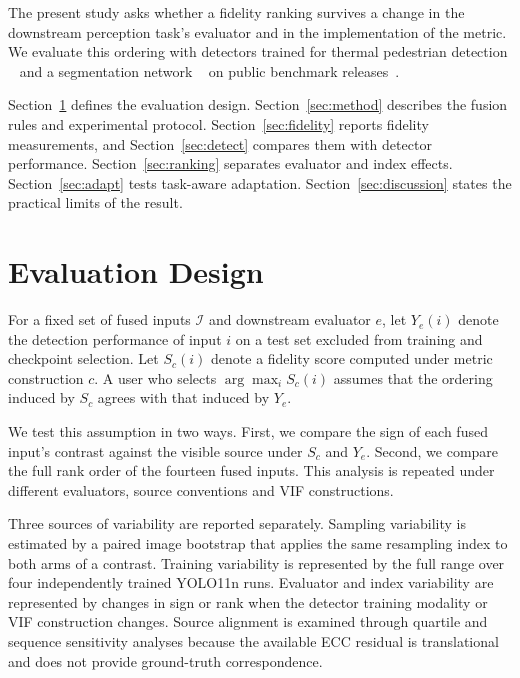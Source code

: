 \documentclass[10pt,a4paper]{article}
\begin{document}
The present study asks whether a fidelity ranking survives a change in the downstream
perception task's evaluator and in the implementation of the metric. We evaluate this
ordering with detectors trained for thermal pedestrian detection
~\cite{redmon2016yolo,jocher2024yolo,lv2024rtdetr} and a segmentation network
~\cite{ronneberger2015} on public benchmark releases~\cite{flir_adas}.

Section~\ref{sec:validity} defines the evaluation design.
Section~\ref{sec:method} describes the fusion rules and experimental protocol.
Section~\ref{sec:fidelity} reports fidelity measurements, and
Section~\ref{sec:detect} compares them with detector performance.
Section~\ref{sec:ranking} separates evaluator and index effects.
Section~\ref{sec:adapt} tests task-aware adaptation.
Section~\ref{sec:discussion} states the practical limits of the result.

\section{Evaluation Design}
\label{sec:validity}

For a fixed set of fused inputs $\mathcal{I}$ and downstream evaluator $e$, let
$Y_e(i)$ denote the detection performance of input $i$ on a test set excluded from
training and checkpoint selection. Let $S_c(i)$ denote a fidelity score computed under
metric construction $c$. A user who selects $\arg\max_i S_c(i)$ assumes that the
ordering induced by $S_c$ agrees with that induced by $Y_e$.

We test this assumption in two ways. First, we compare the sign of each fused input's
contrast against the visible source under $S_c$ and $Y_e$. Second, we compare the full
rank order of the fourteen fused inputs. This analysis is repeated under different
evaluators, source conventions and VIF constructions.

Three sources of variability are reported separately. Sampling variability is estimated
by a paired image bootstrap that applies the same resampling index to both arms of a
contrast. Training variability is represented by the full range over four independently
trained YOLO11n runs. Evaluator and index variability are represented by changes in
sign or rank when the detector training modality or VIF construction changes. Source
alignment is examined through quartile and sequence sensitivity analyses because the
available ECC residual is translational and does not provide ground-truth
correspondence.
\end{document}
